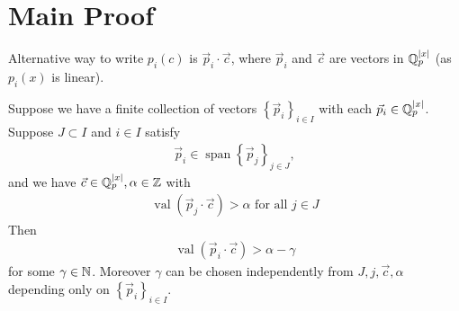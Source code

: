 \documentclass{amsart}
\newcommand{\curly}[1]{\left\{#1\right\}}
\DeclareMathOperator{\vecspan}{span}
\DeclareMathOperator{\val}{val}
\begin{document}

\section{Main Proof}


Alternative way to write $p_i(c)$ is $\vec p_i \cdot \vec c$,
where $\vec p_i$ and $\vec c$ are vectors in $\mathbb{Q}_p^{|x|}$ (as $p_i(x)$ is linear).

\begin{Lemma}	 \label{gamma}
  Suppose we have a finite collection of vectors $\curly{\vec p_i}_{i \in I}$ with each $\vec p_i \in \mathbb{Q}_p^{|x|}$.
  Suppose $J \subset I$ and $i \in I$ satisfy
  \begin{align*}
    \vec p_i \in \vecspan \curly{\vec p_j}_{j \in J}, 
  \end{align*}
  and we have $\vec c \in \mathbb{Q}_p^{|x|}, \alpha \in \mathbb{Z}$ with
  \begin{align*}
    \val(\vec p_j \cdot \vec c) > \alpha \text{ for all } j \in J
  \end{align*}
  Then
  \begin{align*}
    \val(\vec p_i \cdot \vec c) > \alpha - \gamma
  \end{align*}
  for some $\gamma \in \mathbb{N}$.
  Moreover $\gamma$ can be chosen independently from $J, j, \vec c, \alpha$ depending only on $\curly{\vec p_i}_{i \in I}$.
\end{Lemma}
\end{document}
